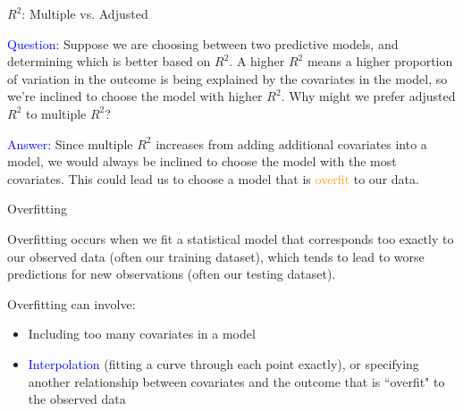 \documentclass[10pt,t]{beamer}
\begin{document}
\begin{frame}{$R^2$: Multiple vs. Adjusted}

\textcolor{blue}{Question:} Suppose we are choosing between two predictive models, and determining which is better based on $R^2$. A higher $R^2$ means a higher proportion of variation in the outcome is being explained by the covariates in the model, so we're inclined to choose the model with higher $R^2$. Why might we prefer adjusted $R^2$ to multiple $R^2$? \pause

\vspace{0.3cm}

\textcolor{blue}{Answer:} Since multiple $R^2$ increases from adding additional covariates into a model, we would always be inclined to choose the model with the most covariates. This could lead us to choose a model that is \textcolor{orange}{overfit} to our data.

\end{frame}

\begin{frame}{Overfitting}

Overfitting occurs when we fit a statistical model that corresponds too exactly to our observed data (often our training dataset), which tends to lead to worse predictions for new observations (often our testing dataset).

\vspace{0.3cm}

Overfitting can involve:

\vspace{0.3cm}

\begin{itemize}
	\item Including too many covariates in a model 
	\item \textcolor{blue}{Interpolation} (fitting a curve through each point exactly), or specifying another relationship between covariates and the outcome that is ``overfit" to the observed data
\end{itemize}

\end{frame}
\end{document}
